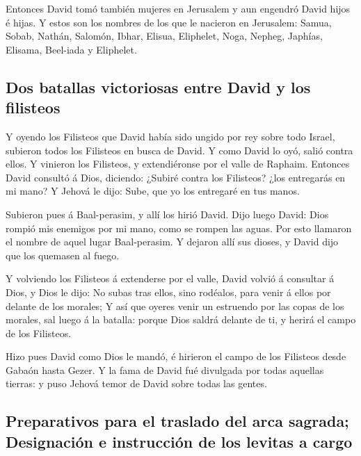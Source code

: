  Entonces David tomó también mujeres en Jerusalem y aun
engendró David hijos é hijas.  Y estos son los nombres de
los que le nacieron en Jerusalem: Samua, Sobab, Nathán, Salomón,
 Ibhar, Elisua, Eliphelet,  Noga, Nepheg,
Japhías,  Elisama, Beel-iada y Eliphelet.

\hypertarget{dos-batallas-victoriosas-entre-david-y-los-filisteos}{%
\subsection{Dos batallas victoriosas entre David y los
filisteos}\label{dos-batallas-victoriosas-entre-david-y-los-filisteos}}

 Y oyendo los Filisteos que David había sido ungido por
rey sobre todo Israel, subieron todos los Filisteos en busca de David. Y
como David lo oyó, salió contra ellos.  Y vinieron los
Filisteos, y extendiéronse por el valle de Raphaim. 
Entonces David consultó á Dios, diciendo: ¿Subiré contra los Filisteos?
¿los entregarás en mi mano? Y Jehová le dijo: Sube, que yo los entregaré
en tus manos.

 Subieron pues á Baal-perasim, y allí los hirió David.
Dijo luego David: Dios rompió mis enemigos por mi mano, como se rompen
las aguas. Por esto llamaron el nombre de aquel lugar Baal-perasim.
 Y dejaron allí sus dioses, y David dijo que los quemasen
al fuego.

 Y volviendo los Filisteos á extenderse por el valle,
 David volvió á consultar á Dios, y Dios le dijo: No
subas tras ellos, sino rodéalos, para venir á ellos por delante de los
morales;  Y así que oyeres venir un estruendo por las
copas de los morales, sal luego á la batalla: porque Dios saldrá delante
de ti, y herirá el campo de los Filisteos.

 Hizo pues David como Dios le mandó, é hirieron el campo
de los Filisteos desde Gabaón hasta Gezer.  Y la fama de
David fué divulgada por todas aquellas tierras: y puso Jehová temor de
David sobre todas las gentes.

\hypertarget{preparativos-para-el-traslado-del-arca-sagrada-designaciuxf3n-e-instrucciuxf3n-de-los-levitas-a-cargo}{%
\subsection{Preparativos para el traslado del arca sagrada; Designación
e instrucción de los levitas a
cargo}\label{preparativos-para-el-traslado-del-arca-sagrada-designaciuxf3n-e-instrucciuxf3n-de-los-levitas-a-cargo}}

